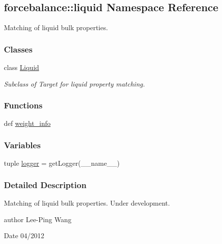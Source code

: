 \hypertarget{namespaceforcebalance_1_1liquid}{\subsection{forcebalance\-:\-:liquid \-Namespace \-Reference}
\label{namespaceforcebalance_1_1liquid}
}


\-Matching of liquid bulk properties.  


\subsubsection*{\-Classes}
\begin{DoxyCompactItemize}
\item 
class \hyperlink{classforcebalance_1_1liquid_1_1Liquid}{\-Liquid}
\begin{DoxyCompactList}\small\item\em \-Subclass of \-Target for liquid property matching. \end{DoxyCompactList}\end{DoxyCompactItemize}
\subsubsection*{\-Functions}
\begin{DoxyCompactItemize}
\item 
def \hyperlink{namespaceforcebalance_1_1liquid_a6f7d54263236f8788c319aee86b460b6}{weight\-\_\-info}
\end{DoxyCompactItemize}
\subsubsection*{\-Variables}
\begin{DoxyCompactItemize}
\item 
tuple \hyperlink{namespaceforcebalance_1_1liquid_a82691ecf186d3b94b7c4915ac590d178}{logger} = get\-Logger(\-\_\-\-\_\-name\-\_\-\-\_\-)
\end{DoxyCompactItemize}


\subsubsection{\-Detailed \-Description}
\-Matching of liquid bulk properties. \-Under development.

author \-Lee-\/\-Ping \-Wang \begin{DoxyDate}{\-Date}
04/2012 
\end{DoxyDate}


